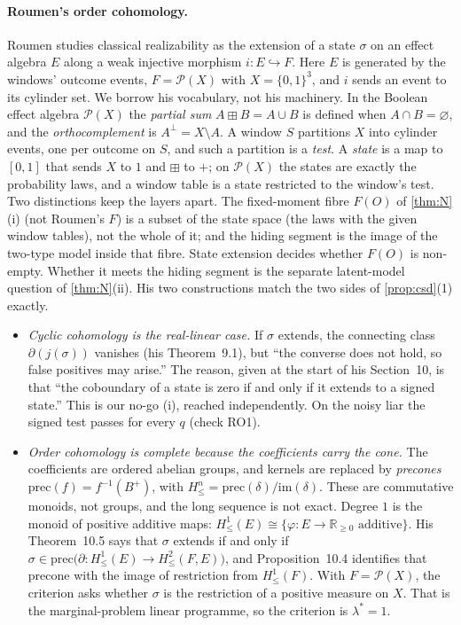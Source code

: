 \documentclass[11pt]{article}
\theoremstyle{definition}\newtheorem{definition}{Definition}\newtheorem{remark}{Remark}
\begin{document}
\paragraph{Roumen's order cohomology.} Roumen \cite{Roumen2017} studies classical realizability as the extension of a state
$\sigma$ on an effect algebra $E$ along a weak injective morphism $i:E\hookrightarrow F$. Here $E$ is generated by the windows' outcome
events, $F=\mathcal P(X)$ with $X=\{0,1\}^3$, and $i$ sends an event to its cylinder set. We borrow his vocabulary, not his machinery.
In the Boolean effect algebra $\mathcal P(X)$ the \emph{partial sum} $A\boxplus B=A\cup B$ is defined when $A\cap B=\varnothing$, and the
\emph{orthocomplement} is $A^\perp=X\setminus A$. A window $S$ partitions $X$ into cylinder events, one per outcome on $S$, and such a
partition is a \emph{test}. A \emph{state} is a map to $[0,1]$ that sends $X$ to $1$ and $\boxplus$ to $+$; on $\mathcal P(X)$ the states are
exactly the probability laws, and a window table is a state restricted to the window's test. Two distinctions keep the layers apart.
The fixed-moment fibre $F(O)$ of \cref{thm:N}(i) (not Roumen's $F$) is a subset of the state space (the laws with the given window tables), not the whole of it; and the
hiding segment is the image of the two-type model inside that fibre. State extension decides whether $F(O)$ is non-empty. Whether
it meets the hiding segment is the separate latent-model question of \cref{thm:N}(ii). His two constructions match the two sides of
\cref{prop:csd}(1) exactly.
\begin{itemize}
\item \emph{Cyclic cohomology is the real-linear case.} If $\sigma$ extends, the connecting class $\partial(j(\sigma))$ vanishes
  (his Theorem~9.1), but ``the converse does not hold, so false positives may arise.'' The reason, given at the start of his Section~10,
  is that ``the coboundary of a state is zero if and only if it extends to a signed state.'' This is our no-go (i), reached independently.
  On the noisy liar the signed test passes for every $q$ (check RO1).
\item \emph{Order cohomology is complete because the coefficients carry the cone.} The coefficients are ordered abelian groups, and kernels
  are replaced by \emph{precones} $\mathrm{prec}(f)=f^{-1}(B^+)$, with $H^n_\le=\mathrm{prec}(\delta)/\mathrm{im}(\delta)$. These are
  commutative monoids, not groups, and the long sequence is not exact. Degree $1$ is the monoid of positive additive maps:
  $H^1_\le(E)\cong\{\varphi:E\to\mathbb R_{\ge0}\text{ additive}\}$. His Theorem~10.5 says that $\sigma$ extends if and only if
  $\sigma\in\mathrm{prec}\bigl(\partial:H^1_\le(E)\to H^2_\le(F,E)\bigr)$, and Proposition~10.4 identifies that precone with the image of
  restriction from $H^1_\le(F)$. With $F=\mathcal P(X)$, the criterion asks whether $\sigma$ is the restriction of a positive measure on
  $X$. That is the marginal-problem linear programme, so the criterion is $\lambda^*=1$.
\end{itemize}
\end{document}
